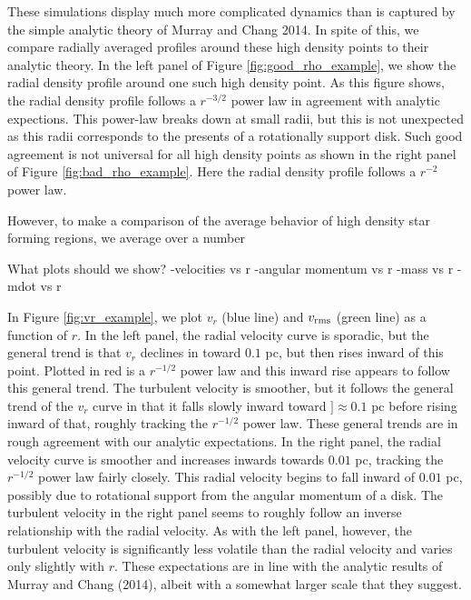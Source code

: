 \documentclass{emulateapj}
\begin{document}
These simulations display much more complicated dynamics than is captured by the simple analytic theory of Murray and Chang 2014.  In spite of this, we compare radially averaged profiles around these high density points to their analytic theory.  In the left panel of Figure \ref{fig:good_rho_example}, we show the radial density profile around one such high density point. As this figure shows, the radial density profile follows a $r^{-3/2}$ power law in agreement with analytic expections.  This power-law breaks down at small radii, but this is not unexpected as this radii corresponds to the presents of a rotationally support disk.  Such good agreement is not universal for all high density points as shown in the right panel of Figure \ref{fig:bad_rho_example}.  Here the radial density profile follows a $r^{-2}$ power law.  


However, to make a comparison of the average behavior of high density star forming regions, we average over a number 

What plots should we show?
-velocities vs r
-angular momentum vs r
-mass vs r
-mdot vs r

In Figure \ref{fig:vr_example}, we plot $v_r$ (blue line) and $v_{\rm rms}$ (green line) as a function of $r$.  In the left panel, the radial velocity curve is sporadic, but the general trend is that $v_r$ declines in toward $0.1$ pc, but then rises inward of this point.  Plotted in red is a $r^{-1/2}$ power law and this inward rise appears to follow this general trend.  The turbulent velocity is smoother, but it follows the general trend of the $v_r$ curve in that it falls slowly inward toward $]\approx 0.1 $ pc before rising inward of that, roughly tracking the $r^{-1/2}$ power law.  These general trends are in rough agreement with our analytic expectations.  In the right panel, the radial velocity curve is smoother and increases inwards towards $0.01$ pc, tracking the $r^{-1/2}$ power law fairly closely.  This radial velocity begins to fall inward of $0.01$ pc, possibly due to rotational support from the angular momentum of a disk.  The turbulent velocity in the right panel seems to roughly follow an inverse relationship with the radial velocity.  As with the left panel, however, the turbulent velocity is significantly less volatile than the radial velocity and varies only slightly with $r$.   These expectations are in line with the analytic results of Murray and Chang (2014), albeit with a somewhat larger scale that they suggest.  
 
\end{document}
